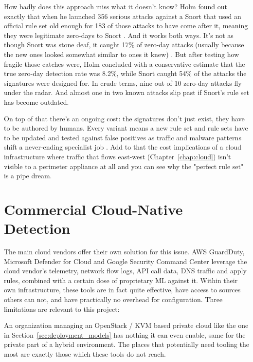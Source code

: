 How badly does this approach miss what it doesn't know?
Holm found out exactly that when he launched 356 serious attacks against a Snort that used an official rule set old enough for 183 of those attacks to have come after it, meaning they were legitimate zero-days to Snort \cite{holm2014signature}. And it works both ways.
It's not as though Snort was stone deaf, it caught 17\% of zero-day attacks (usually because the new ones looked somewhat similar to ones it knew) \cite{holm2014signature}.
But after testing how fragile those catches were, Holm concluded with a conservative estimate that the true zero-day detection rate was 8.2\%, while Snort caught 54\% of the attacks the signatures were designed for. In crude terms, nine out of 10 zero-day attacks fly under the radar. And almost one in two known attacks slip past if Snort's rule set has become outdated.


On top of that there's an ongoing cost: the signatures don't just exist, they have to be authored by humans. Every variant means a new rule set and rule sets have to be updated and tested against false positives as traffic and malware patterns shift a never-ending specialist job \cite{khraisat2019survey}. Add to that the cost implications of a cloud infrastructure where traffic that flows east-west (Chapter~\ref{chap:cloud}) isn't visible to a perimeter appliance at all and you can see why the "perfect rule set" is a pipe dream.

\section{Commercial Cloud-Native Detection}
\label{sec:ids_commercial}

The main cloud vendors offer their own solution for this issue. AWS GuardDuty, Microsoft Defender for Cloud and Google Security Command Center leverage the cloud vendor’s telemetry, network flow logs, API call data, DNS traffic and apply rules, combined with a certain dose of proprietary ML against it. Within their own infrastructure, these tools are in fact quite effective, have access to sources others can not, and have practically no overhead for configuration.
Three limitations are relevant to this project:

An organization managing an OpenStack / KVM based private cloud like the one in Section~\ref{sec:deployment_models} has nothing it can even enable, same for the private part of a hybrid environment. The places that potentially need tooling the most are exactly those which these tools do not reach.

